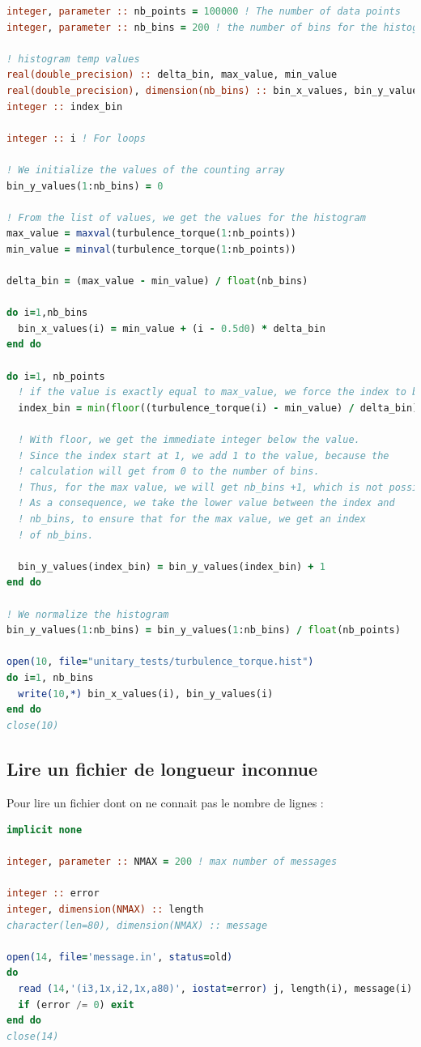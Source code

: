 \documentclass[a4paper,twoside]{article}
\begin{document}
\begin{lstlisting}[language=Fortran]
integer, parameter :: nb_points = 100000 ! The number of data points
integer, parameter :: nb_bins = 200 ! the number of bins for the histogram

! histogram temp values
real(double_precision) :: delta_bin, max_value, min_value
real(double_precision), dimension(nb_bins) :: bin_x_values, bin_y_values
integer :: index_bin

integer :: i ! For loops

! We initialize the values of the counting array
bin_y_values(1:nb_bins) = 0

! From the list of values, we get the values for the histogram
max_value = maxval(turbulence_torque(1:nb_points))
min_value = minval(turbulence_torque(1:nb_points))

delta_bin = (max_value - min_value) / float(nb_bins)

do i=1,nb_bins
  bin_x_values(i) = min_value + (i - 0.5d0) * delta_bin
end do
  
do i=1, nb_points
  ! if the value is exactly equal to max_value, we force the index to be nb_bins
  index_bin = min(floor((turbulence_torque(i) - min_value) / delta_bin)+1, nb_bins)
  
  ! With floor, we get the immediate integer below the value. 
  ! Since the index start at 1, we add 1 to the value, because the 
  ! calculation will get from 0 to the number of bins. 
  ! Thus, for the max value, we will get nb_bins +1, which is not possible. 
  ! As a consequence, we take the lower value between the index and 
  ! nb_bins, to ensure that for the max value, we get an index 
  ! of nb_bins.
  
  bin_y_values(index_bin) = bin_y_values(index_bin) + 1
end do

! We normalize the histogram
bin_y_values(1:nb_bins) = bin_y_values(1:nb_bins) / float(nb_points)

open(10, file="unitary_tests/turbulence_torque.hist")
do i=1, nb_bins
  write(10,*) bin_x_values(i), bin_y_values(i)
end do
close(10)
\end{lstlisting}

\subsection{Lire un fichier de longueur inconnue}
Pour lire un fichier dont on ne connait pas le nombre de lignes : 
\begin{lstlisting}[language=Fortran]
implicit none

integer, parameter :: NMAX = 200 ! max number of messages

integer :: error
integer, dimension(NMAX) :: length
character(len=80), dimension(NMAX) :: message

open(14, file='message.in', status=old)
do
  read (14,'(i3,1x,i2,1x,a80)', iostat=error) j, length(i), message(i)
  if (error /= 0) exit
end do
close(14)
\end{lstlisting}
\end{document}
